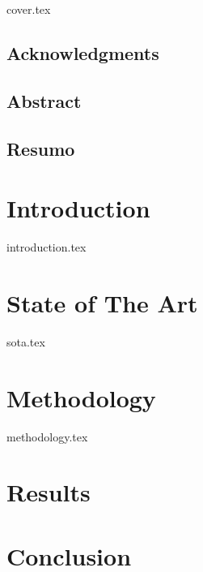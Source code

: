 \documentclass[a4paper, 12pt]{report}
\begin{document}
{cover.tex}
\newpage
\tableofcontents
\frontmatter
\section*{Acknowledgments}

\newpage
\section*{Abstract}

\newpage
\section*{Resumo}

\mainmatter


\newpage
\chapter{Introduction}
{introduction.tex}

\newpage
\chapter{State of The Art}
{sota.tex}

\newpage
\chapter{Methodology}
{methodology.tex}
\newpage
\chapter{Results}

\newpage
\chapter{Conclusion}

\newpage
\printbibliography
\end{document}
